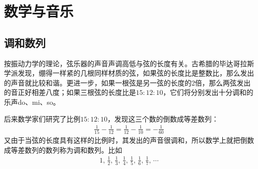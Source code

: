 
\chapter{数学与音乐}
\label{chap:math-and-music}

\section{调和数列}
\label{sec:harmonic-series}

按振动力学的理论，弦乐器的声音声调高低与弦的长度有关。古希腊的毕达哥拉斯学派发现，绷得一样紧的几根同样材质的弦，如果弦的长度比是整数比，那么发出的声音就比较和谐。更进一步，如果一根弦是另一弦的长度的2倍，那么两弦发出的音正好相差八度；如果三根弦的长度比是$15:12:10$，它们将分别发出十分调和的乐声do、mi、so。

后来数学家们研究了比例$15:12:10$，发现这三个数的倒数成等差数列：
\begin{align*}
  \frac1{15}-\frac1{12} = \frac1{12}-\frac1{10} = -\frac1{60}
\end{align*}
又由于当弦的长度具有这样的比例时，其发出的声音很调和，所以数学上就把倒数成等差数列的数列称为调和数列。比如
\begin{align*}
  1,\,\frac12,\, \frac13,\, \frac14,\, \frac15,\, \frac16,\, \frac17,\, \cdots
\end{align*}

